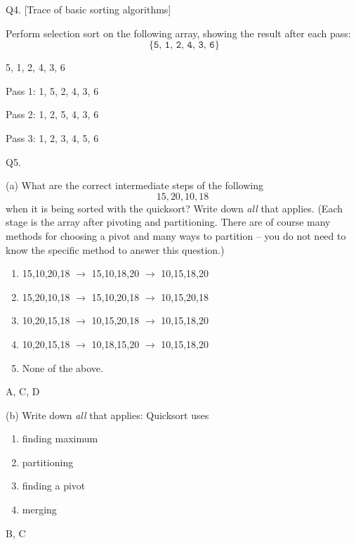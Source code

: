 \newpage
Q4. [Trace of basic sorting algorithms]

Perform selection sort on the following array, showing
the result after each pass:
\[
\texttt{ \{5, 1, 2, 4, 3, 6\} } 
\]
\ANSWER
\begin{answercode}
{5, 1, 2, 4, 3, 6}

Pass 1:
{1, 5, 2, 4, 3, 6}

Pass 2:
{1, 2, 5, 4, 3, 6}

Pass 3:
{1, 2, 3, 4, 5, 6}

\end{answercode}


\newpage
Q5.

(a) 
What are the correct intermediate steps of the following
\[
15,20,10,18
\]
when it is
being sorted with the quicksort?
Write down \textit{all} that applies.
(Each stage is the array after pivoting and partitioning.
There are of course many methods for choosing a pivot 
and many ways to partition -- 
you do not need to know the specific method to answer this question.)
\begin{enumerate}
\item[(A)] 15,10,20,18 $\rightarrow$ 15,10,18,20 $\rightarrow$ 10,15,18,20
\item[(B)] 15,20,10,18 $\rightarrow$ 15,10,20,18 $\rightarrow$ 10,15,20,18
\item[(C)] 10,20,15,18 $\rightarrow$ 10,15,20,18 $\rightarrow$ 10,15,18,20
\item[(D)] 10,20,15,18 $\rightarrow$ 10,18,15,20 $\rightarrow$ 10,15,18,20
\item[(E)] None of the above.
\end{enumerate}
\ANSWER
\begin{answercode}
A, C, D
\end{answercode}


(b) Write down \textit{all} that applies: Quicksort uses
\begin{enumerate}
\item[(A)] finding maximum 
\item[(B)] partitioning
\item[(C)] finding a pivot
\item[(D)] merging
\end{enumerate}
\ANSWER
\begin{answercode}
B, C
\end{answercode}


